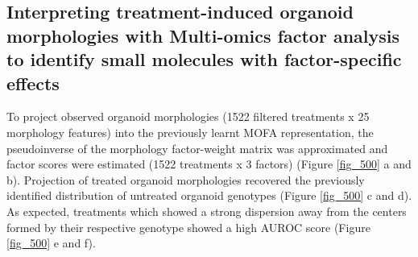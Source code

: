\begin{flushleft}
\newpage
\section{Interpreting treatment-induced organoid morphologies with Multi-omics factor analysis to identify small molecules with factor-specific effects}

To project observed organoid morphologies (1522 filtered treatments x 25 morphology features) into the previously learnt MOFA representation, the pseudoinverse of the morphology factor-weight matrix was approximated and factor scores were estimated (1522 treatments x 3 factors) (Figure \ref{fig_500} a and b). Projection of treated organoid morphologies recovered the previously identified distribution of untreated organoid genotypes (Figure \ref{fig_500} c and d). As expected, treatments which showed a strong dispersion away from the centers formed by their respective genotype showed a high AUROC score (Figure \ref{fig_500} e and f).
\bigbreak


\end{flushleft}
